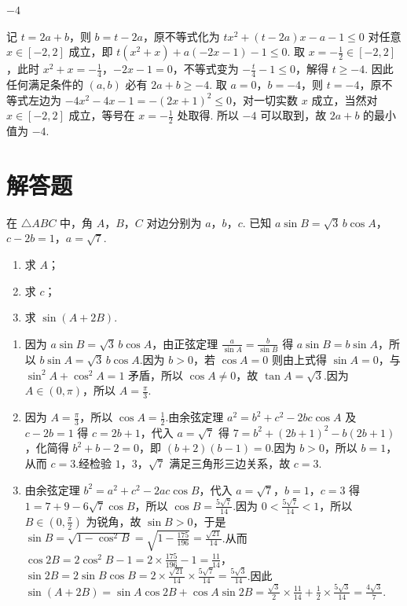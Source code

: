 \documentclass[UTF8,a4paper,oneside,11pt]{ctexbook}
\begin{document}
\begin{answer}
\(-4\)
\end{answer}

\begin{solution}
记 \(t=2a+b\)，则 \(b=t-2a\)，原不等式化为 \(tx^{2}+(t-2a)x-a-1\le 0\) 对任意 \(x\in[-2,2]\) 成立，即 \(t(x^{2}+x)+a(-2x-1)-1\le 0\). 取 \(x=-\frac12\in[-2,2]\)，此时 \(x^{2}+x=-\frac14\)，\(-2x-1=0\)，不等式变为 \(-\frac{t}{4}-1\le 0\)，解得 \(t\ge -4\). 因此任何满足条件的 \((a,b)\) 必有 \(2a+b\ge -4\). 取 \(a=0\)，\(b=-4\)，则 \(t=-4\)，原不等式左边为 \(-4x^{2}-4x-1=-(2x+1)^{2}\le 0\)，对一切实数 \(x\) 成立，当然对 \(x\in[-2,2]\) 成立，等号在 \(x=-\frac12\) 处取得. 所以 \(-4\) 可以取到，故 \(2a+b\) 的最小值为 \(-4\).
\end{solution}
\section{解答题}

\begin{problem}
在 \(\triangle ABC\) 中，角 \(A\)，\(B\)，\(C\) 对边分别为 \(a\)，\(b\)，\(c\). 已知 \(a\sin B=\sqrt3\,b\cos A\)，\(c-2b=1\)，\(a=\sqrt7\).
\begin{enumerate}
    \item 求 \(A\)；
    \item 求 \(c\)；
    \item 求 \(\sin(A+2B)\).
\end{enumerate}
\end{problem}

\begin{solution}
\begin{enumerate}
\item 因为 \(a\sin B=\sqrt3\,b\cos A\)，由正弦定理 \(\frac{a}{\sin A}=\frac{b}{\sin B}\) 得 \(a\sin B=b\sin A\)，所以 \(b\sin A=\sqrt3\,b\cos A\).因为 \(b>0\)，若 \(\cos A=0\) 则由上式得 \(\sin A=0\)，与 \(\sin^2 A+\cos^2 A=1\) 矛盾，所以 \(\cos A\ne 0\)，故 \(\tan A=\sqrt3\).因为 \(A\in\left(0,\pi\right)\)，所以 \(A=\frac{\pi}{3}\).
\item 因为 \(A=\frac{\pi}{3}\)，所以 \(\cos A=\frac{1}{2}\).由余弦定理 \(a^2=b^2+c^2-2bc\cos A\) 及 \(c-2b=1\) 得 \(c=2b+1\)，代入 \(a=\sqrt7\) 得 \(7=b^2+\left(2b+1\right)^2-b\left(2b+1\right)\)，化简得 \(b^2+b-2=0\)，即 \(\left(b+2\right)\left(b-1\right)=0\).因为 \(b>0\)，所以 \(b=1\)，从而 \(c=3\).经检验 \(1\)，\(3\)，\(\sqrt7\) 满足三角形三边关系，故 \(c=3\).
\item 由余弦定理 \(b^2=a^2+c^2-2ac\cos B\)，代入 \(a=\sqrt7\)，\(b=1\)，\(c=3\) 得 \(1=7+9-6\sqrt7\cos B\)，所以 \(\cos B=\frac{5\sqrt7}{14}\).因为 \(0<\frac{5\sqrt7}{14}<1\)，所以 \(B\in\left(0,\frac{\pi}{2}\right)\) 为锐角，故 \(\sin B>0\)，于是 \(\sin B=\sqrt{1-\cos^2 B}=\sqrt{1-\frac{175}{196}}=\frac{\sqrt{21}}{14}\).从而 \(\cos 2B=2\cos^2 B-1=2\times\frac{175}{196}-1=\frac{11}{14}\)，\(\sin 2B=2\sin B\cos B=2\times\frac{\sqrt{21}}{14}\times\frac{5\sqrt7}{14}=\frac{5\sqrt3}{14}\).因此 \(\sin\left(A+2B\right)=\sin A\cos 2B+\cos A\sin 2B=\frac{\sqrt3}{2}\times\frac{11}{14}+\frac12\times\frac{5\sqrt3}{14}=\frac{4\sqrt3}{7}\).
\end{enumerate}
\end{solution}
\end{document}
